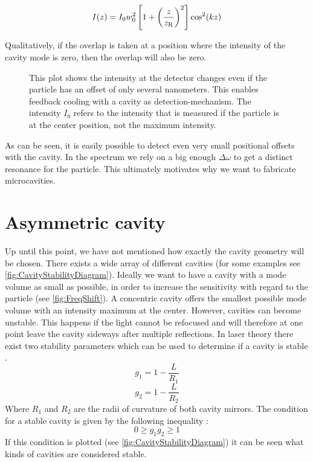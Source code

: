 \begin{equation}
	I(z)=I_0w_0^2\left[1+\left(\frac{z}{\de{z}{R}}\right)^2\right]\cos^2(kz)
\end{equation}

Qualitatively, if the overlap is taken at a position where the intensity of the cavity mode is zero, then the overlap will also be zero.

\begin{figure}[H]
	
	\caption{This plot shows the intensity at the detector changes even if the particle has an offset of only several nanometers. This enables feedback cooling with a cavity as detection-mechanism. The intensity $I_0$ refers to the intensity that is measured if the particle is at the center position, not the maximum intensity.}
\end{figure}

As can be seen, it is easily possible to detect even very small positional offsets with the cavity. In the spectrum we rely on a big enough $\Delta\omega$ to get a distinct resonance for the particle. This ultimately motivates why we want to fabricate microcavities.\\

\section{Asymmetric cavity}\label{ChapCavityStability}
Up until this point, we have not mentioned how exactly the cavity geometry will be chosen. There exists a wide array of different cavities (for some examples see \autoref{fig:CavityStabilityDiagram}). Ideally we want to have a cavity with a mode volume as small as possible, in order to increase the sensitivity with regard to the particle (see \autoref{fig:FreqShift}). A concentric cavity offers the smallest possible mode volume with an intensity maximum at the center. However, cavities can become unstable. This happens if the light cannot be refocused and will therefore at one point leave the cavity sideways after multiple reflections. In laser theory there exist two stability parameters which can be used to determine if a cavity is stable \cite[p.~746]{siegman1986lasers}.
\begin{equation}
	g_1=1-\frac{L}{R_1}
\end{equation}
\begin{equation}
	g_2=1-\frac{L}{R_2}
\end{equation}
Where $R_1$ and $R_2$ are the radii of curvature of both cavity mirrors. The condition for a stable cavity is given by the following inequality \cite[p.~747]{siegman1986lasers}:
\begin{equation}
	0\geq g_1g_2\geq 1
\end{equation}
If this condition is plotted (see \autoref{fig:CavityStabilityDiagram}) it can be seen what kinds of cavities are considered stable.

